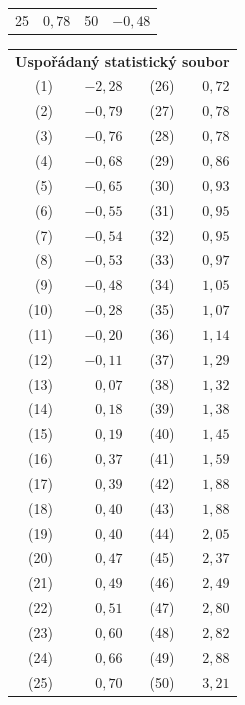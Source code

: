 \documentclass[a4paper, 11pt]{article}
\begin{document}
\begin{table}[H]
\begin{tabular}{r|r|r|r|}
			25 & $ 0,78 $ & 50 & $ -0,48 $ \\ \cline{2-2} \cline{4-4}
		\end{tabular}
%
		\hspace{4em}
%
		\begin{tabular}{r|r|r|r|}
			\multicolumn{4}{r}{\textbf{Uspořádaný statistický soubor}} \\[1em]
			\cline{2-2} \cline{4-4}
			(1) & $ -2,28 $ & (26) & $ 0,72 $ \\ \cline{2-2} \cline{4-4}
			(2) & $ -0,79 $ & (27) & $ 0,78 $ \\ \cline{2-2} \cline{4-4}
			(3) & $ -0,76 $ & (28) & $ 0,78 $ \\ \cline{2-2} \cline{4-4}
			(4) & $ -0,68 $ & (29) & $ 0,86 $ \\ \cline{2-2} \cline{4-4}
			(5) & $ -0,65 $ & (30) & $ 0,93 $ \\ \cline{2-2} \cline{4-4}
			(6) & $ -0,55 $ & (31) & $ 0,95 $ \\ \cline{2-2} \cline{4-4}
			(7) & $ -0,54 $ & (32) & $ 0,95 $ \\ \cline{2-2} \cline{4-4}
			(8) & $ -0,53 $ & (33) & $ 0,97 $ \\ \cline{2-2} \cline{4-4}
			(9) & $ -0,48 $ & (34) & $ 1,05 $ \\ \cline{2-2} \cline{4-4}
			(10) & $ -0,28 $ & (35) & $ 1,07 $ \\ \cline{2-2} \cline{4-4}
			(11) & $ -0,20 $ & (36) & $ 1,14 $ \\ \cline{2-2} \cline{4-4}
			(12) & $ -0,11 $ & (37) & $ 1,29 $ \\ \cline{2-2} \cline{4-4}
			(13) & $ 0,07 $ & (38) & $ 1,32 $ \\ \cline{2-2} \cline{4-4}
			(14) & $ 0,18 $ & (39) & $ 1,38 $ \\ \cline{2-2} \cline{4-4}
			(15) & $ 0,19 $ & (40) & $ 1,45 $ \\ \cline{2-2} \cline{4-4}
			(16) & $ 0,37 $ & (41) & $ 1,59 $ \\ \cline{2-2} \cline{4-4}
			(17) & $ 0,39 $ & (42) & $ 1,88 $ \\ \cline{2-2} \cline{4-4}
			(18) & $ 0,40 $ & (43) & $ 1,88 $ \\ \cline{2-2} \cline{4-4}
			(19) & $ 0,40 $ & (44) & $ 2,05 $ \\ \cline{2-2} \cline{4-4}
			(20) & $ 0,47 $ & (45) & $ 2,37 $ \\ \cline{2-2} \cline{4-4}
			(21) & $ 0,49 $ & (46) & $ 2,49 $ \\ \cline{2-2} \cline{4-4}
			(22) & $ 0,51 $ & (47) & $ 2,80 $ \\ \cline{2-2} \cline{4-4}
			(23) & $ 0,60 $ & (48) & $ 2,82 $ \\ \cline{2-2} \cline{4-4}
			(24) & $ 0,66 $ & (49) & $ 2,88 $ \\ \cline{2-2} \cline{4-4}
			(25) & $ 0,70 $ & (50) & $ 3,21 $ \\ \cline{2-2} \cline{4-4}
		\end{tabular}
	\end{table}
\end{document}
